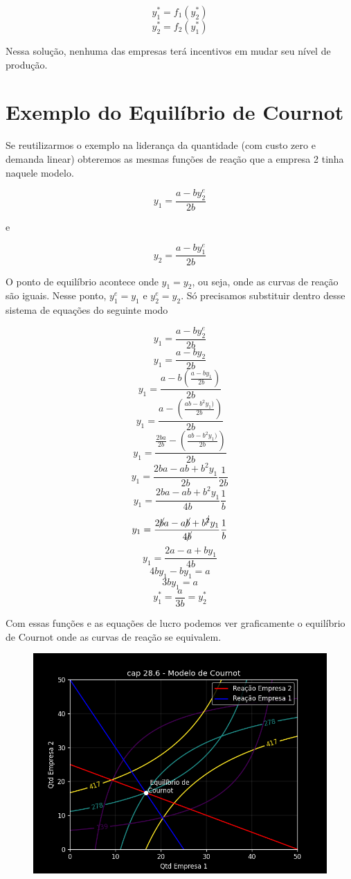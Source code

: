 \documentclass[a4paper,11pt,oneside]{book}
\theoremstyle{definition}
\theoremstyle{break}
\begin{document}
$$ y_1^* = f_1(y_2^*) $$
$$ y_2^* = f_2(y_1^*) $$

Nessa solução, nenhuma das empresas terá incentivos em mudar seu nível de produção.

\section{Exemplo do Equilíbrio de Cournot}

Se reutilizarmos o exemplo na liderança da quantidade (com custo zero e demanda linear) obteremos as mesmas funções de reação que a empresa 2 tinha naquele modelo.

$$ y_1 = \frac{a - by_2^e}{2b} $$

e

$$ y_2 = \frac{a - by_1^e}{2b} $$

O ponto de equilíbrio acontece onde $y_1 = y_2$, ou seja, onde as curvas de reação são iguais. Nesse ponto, $y_1^e = y_1$ e $y_2^e = y_2$. Só precisamos substituir dentro desse sistema de equações do seguinte modo

$$ y_1 = \frac{a - by_2^e}{2b} $$
$$ y_1 = \frac{a - by_2}{2b} $$
$$ y_1 = \frac{a - b(\frac{a - by_1}{2b})}{2b} $$
$$ y_1 = \frac{a - (\frac{ab - b^2y_1)}{2b})}{2b} $$
$$ y_1 = \frac{\frac{2ba}{2b} - (\frac{ab - b^2y_1)}{2b})}{2b} $$
$$ y_1 = \frac{2ba - ab + b^2y_1}{2b}\frac{1}{2b} $$
$$ y_1 = \frac{2ba - ab + b^2y_1}{4b}\frac{1}{b} $$
$$ y_1 = \frac{2\cancel{b}a - a\cancel{b} + b^{\cancel{2}}y_1}{4\cancel{b}}\frac{1}{b} $$
$$ y_1 = \frac{2a - a + by_1}{4b} $$
$$ 4by_1 - by_1 = a $$
$$ 3by_1 = a $$
$$ y_1^* = \frac{a}{3b} = y_2^* $$

Com essas funções e as equações de lucro podemos ver graficamente o equilíbrio de Cournot onde as curvas de reação se equivalem.

\begin{figure}[H]
\centering
\includegraphics[scale=0.75]{cap28_6-modelo_cournot.png}
\end{figure}
\end{document}
